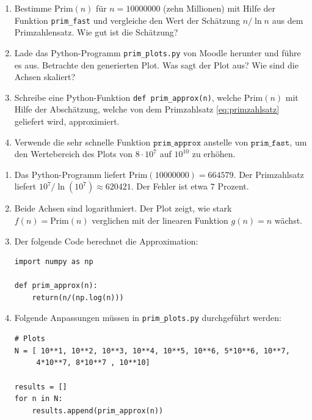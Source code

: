 \begin{Exercise}
\begin{enumerate}[label=(\alph*)]
\item Bestimme $\text{Prim}(n)$ für $n = 10000000$ (zehn Millionen) mit Hilfe der Funktion \texttt{prim_fast} und vergleiche den Wert der Schätzung $n/\ln{n}$ aus dem Primzahlensatz. Wie gut ist die Schätzung?

\item Lade das Python-Programm {\tt prim\_plots.py} von Moodle herunter und führe es aus. Betrachte den generierten Plot. Was sagt der Plot aus? Wie sind die Achsen skaliert?

\item Schreibe eine Python-Funktion \texttt{def prim_approx(n)}, welche $\text{Prim}(n)$ mit Hilfe der Abschätzung, welche von dem Primzahlsatz \ref{eq:primzahlsatz} geliefert wird, approximiert.

\item Verwende die sehr schnelle Funktion $\texttt{prim_approx}$ anstelle von $\texttt{prim_fast}$, um den Wertebereich des Plots von $8\cdot 10^7$ auf $10^{10}$ zu erhöhen.
\end{enumerate}
\end{Exercise}


\begin{Answer}
\begin{enumerate}[label=(\alph*)]
\item Das Python-Programm liefert $\text{Prim}(10000000) = 664579$. Der Primzahlsatz liefert $10^7/\ln{(10^7)}\approx 620421$. Der Fehler ist etwa $7$ Prozent.

\item Beide Achsen sind logarithmiert. Der Plot zeigt, wie stark $f(n) = \text{Prim}(n)$ verglichen mit der linearen Funktion $g(n) = n$ wächst.

\item Der folgende Code berechnet die Approximation:

\begin{verbatim}
import numpy as np

def prim_approx(n):
    return(n/(np.log(n)))
\end{verbatim}
\item 
Folgende Anpassungen müssen in {\tt prim\_plots.py} durchgeführt werden:
\begin{verbatim}
# Plots
N = [ 10**1, 10**2, 10**3, 10**4, 10**5, 10**6, 5*10**6, 10**7,
     4*10**7, 8*10**7 , 10**10]

results = []
for n in N:
    results.append(prim_approx(n))
\end{verbatim}
\end{enumerate}
\end{Answer}


